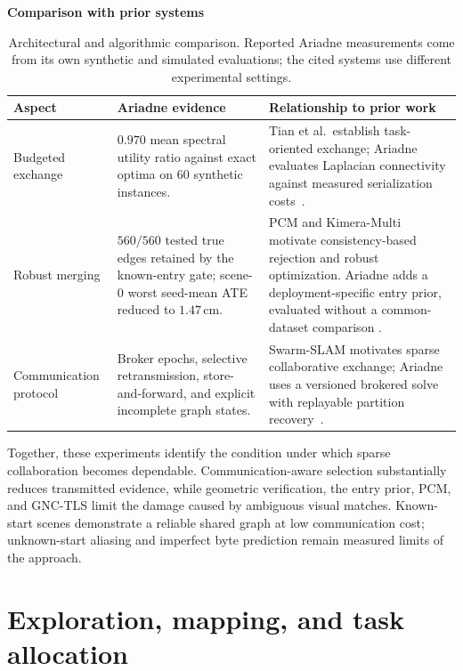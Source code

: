 \documentclass[10pt,a4paper]{article}
\newcommand{\indentedheading}[1]{\par\addvspace{0.65em}\noindent\hspace*{1em}\textbf{#1}\par\smallskip}
\begin{document}
\indentedheading{Comparison with prior systems}

\begin{table}[t]
\centering
\small
\setlength{\tabcolsep}{5pt}
\begin{tabular}{@{}
    p{}
    p{}
    p{}
@{}}
\toprule
\textbf{Aspect} &
\textbf{Ariadne evidence} &
\textbf{Relationship to prior work} \\
\midrule

Budgeted exchange &
$0.970$ mean spectral utility ratio against exact optima
on $60$ synthetic instances. &
Tian et al.\ establish task-oriented exchange;
Ariadne evaluates Laplacian connectivity against measured
serialization costs~\cite{tian2018near}. \\

Robust merging &
$560/560$ tested true edges retained by the known-entry
gate; scene-0 worst seed-mean ATE reduced to $1.47$\,cm. &
PCM and Kimera-Multi motivate consistency-based rejection
and robust optimization. Ariadne adds a deployment-specific
entry prior, evaluated without a common-dataset comparison
\cite{mangelson2018pcm,tian2022kimeramulti}. \\

Communication protocol &
Broker epochs, selective retransmission, store-and-forward,
and explicit incomplete graph states. &
Swarm-SLAM motivates sparse collaborative exchange;
Ariadne uses a versioned brokered solve with replayable
partition recovery~\cite{lajoie2024swarmslam}. \\

\bottomrule
\end{tabular}
\caption{Architectural and algorithmic comparison. Reported Ariadne
measurements come from its own synthetic and simulated evaluations;
the cited systems use different experimental settings.}
\label{tab:collab-prior-work}
\end{table}

Together, these experiments identify the condition under which sparse
collaboration becomes dependable. Communication-aware selection substantially
reduces transmitted evidence, while geometric verification, the entry prior,
PCM, and GNC-TLS limit the damage caused by ambiguous visual matches.
Known-start scenes demonstrate a reliable shared graph at low communication
cost; unknown-start aliasing and imperfect byte prediction remain measured
limits of the approach.


\section{Exploration, mapping, and task allocation}
\end{document}
